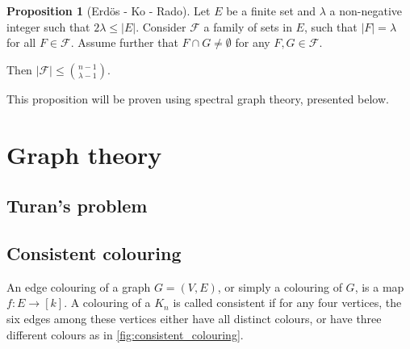 \documentclass[12pt]{amsart}
\theoremstyle{definition}
\newtheorem{prop}[thm]{Proposition}
\newcommand{\FF}{\mathcal F}
\newcommand{\vv}{\mathsf{v}}
\newcommand{\vx}{\mathsf{x}}
\begin{document}
%
%


\begin{prop}[Erd\"os - Ko - Rado]\label{prop:EKR}
Let $E$ be a finite set and  $\lambda $ a non-negative integer such that $2\lambda \leq |E|$.
Consider $\FF$  a family of sets in $E$, such that $|F| = \lambda $ for all $F \in \FF$.
Assume further that $F\cap G \neq \emptyset $ for any $F, G \in \FF$.

Then $|\FF| \leq \binom{n-1}{\lambda - 1}$.
\end{prop}

This proposition will be proven using spectral graph theory, presented below.



\section{Graph theory}

\subsection{Turan's problem}

\subsection{Consistent colouring}

An edge colouring of a graph $G = (V, E)$, or simply a colouring of $G$, is a map $f:E \to [k]$.
A colouring of a $K_n$ is called consistent if for any four vertices, the six edges among these vertices either have all distinct colours, or have three different colours as in \cref{fig:consistent_colouring}.
\end{document}
